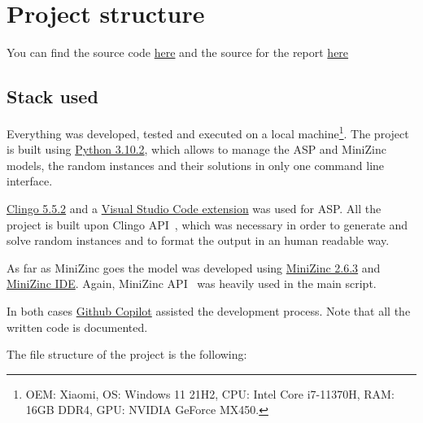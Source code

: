 \section{Project structure}
You can find the source code \href{https://github.com/pinzauti/automated-reasoning}{here} and the source for the report \href{https://github.com/pinzauti/automated-reasoning-report}{here}

\subsection{Stack used}

Everything was developed, tested and executed on a local machine\footnote{OEM: Xiaomi, OS: Windows 11 21H2, CPU: Intel Core i7-11370H, RAM: 16GB DDR4, GPU: NVIDIA GeForce MX450.}. The project is built using \href{https://www.python.org/downloads/release/python-3102/}{Python 3.10.2}, which allows to manage the ASP and MiniZinc models, the random instances and their solutions in only one command line interface.

\href{https://github.com/potassco/clingo/releases/tag/v5.5.2}{Clingo 5.5.2} and a \href{https://marketplace.visualstudio.com/items?itemName=abelcour.asp-syntax-highlight}{Visual Studio Code extension} was used for ASP. All the project is built upon Clingo API~\cite{ClingoAPI}, which was necessary in order to generate and solve random instances and to format the output in an human readable way.

As far as MiniZinc goes the model was developed using \href{https://github.com/MiniZinc/libminizinc/releases/tag/2.6.3}{MiniZinc 2.6.3} and \href{https://www.minizinc.org/ide/}{MiniZinc IDE}. Again, MiniZinc API~\cite{MiniZincPython} was heavily used in the main script.

In both cases \href{https://copilot.github.com/}{Github Copilot} assisted the development process.
Note that all the written code is documented.

The file structure of the project is the following:

